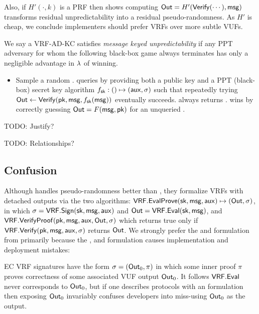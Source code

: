 Also, if $H'(\cdot,k)$ is a PRF then \cite[Proposition 1]{vrf_micali}
shows computing ${\mathsf{Out}} = H'({\mathsf{Verify}}(\cdots), \mathsf{msg})$ transforms
 residual unpredictability into a residual pseudo-randomness.
As $H'$ is cheap, we conclude implementers should prefer VRFs over more subtle VUFs.

\begin{definition}
We say a VRF-AD-KC satisfies {\em message keyed unpredictability} if 
any PPT adversary \adv for whom the following black-box game always
terminates has only a negligible advantage in $\lambda$ of winning.
\begin{itemize}
	\item[]
	Sample a random \msg.
	\adv queries  by providing both a public key \pk and
	a PPT (black-box) secret key algorithm $f_\mathsf{sk} : () \mapsto (\mathsf{aux},\sigma)$ such that
	repeatedly trying ${\mathsf{Out}} \leftarrow {\ensuremath{\mathsf{Verify}}}(\mathsf{pk},\mathsf{msg},f_\mathsf{sk}(\mathsf{msg}))$ eventually succeeds.
	 always returns \Out.
	\adv wins by correctly guessing ${\mathsf{Out}} = F(\mathsf{msg},\mathsf{pk})$ for an unqueried \pk. 
\end{itemize}
\end{definition}

TODO: Justify?

TODO: Relationships?  


\subsection{Confusion}

Although \cite[\S3.2 $\fvrf$]{praos} handles pseudo-randomness better than \cite{vrf_micali},
they formalize VRFs with detached outputs via the two algorithms:
${\mathsf{VRF}}.{\mathsf{EvalProve}}(\mathsf{sk},\mathsf{msg},\mathsf{aux}) \mapsto ({\mathsf{Out}},\sigma)$, in which $\sigma = {\mathsf{VRF}}.{\mathsf{Sign}}(\mathsf{sk},\mathsf{msg},\mathsf{aux})$ and ${\mathsf{Out}} = {\mathsf{VRF}}.{\mathsf{Eval}}(\mathsf{sk},\mathsf{msg})$, and
${\mathsf{VRF}}.{\mathsf{VerifyProof}}(\mathsf{pk},\mathsf{msg},\mathsf{aux},{\mathsf{Out}},\sigma)$ which returns true only if ${\mathsf{VRF}}.{\mathsf{Verify}}(\mathsf{pk},\mathsf{msg},\mathsf{aux},\sigma)$ returns ${\mathsf{Out}}$.
We strongly prefer the \Sign and \Verify formulation from \cite{agg_dkg}
primarily because the , and 
formulation causes implementation and deployment mistakes:

EC VRF signatures have the form $\sigma = ({\mathsf{Out}}_0,\pi)$ in which some
inner proof $\pi$ proves correctness of some associated VUF output ${\mathsf{Out}}_0$. %
It follows ${\mathsf{VRF}}.{\mathsf{Eval}}$ never corresponds to ${\mathsf{Out}}_0$, but if one describes
protocols with an  formulation then exposing ${\mathsf{Out}}_0$
invariably confuses developers into miss-using ${\mathsf{Out}}_0$ as the output.

